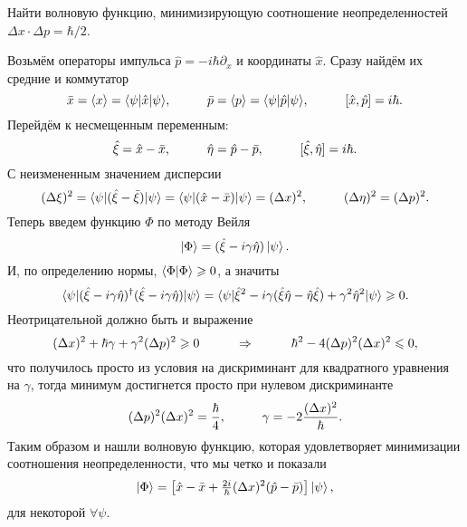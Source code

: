 
\begin{leftrules}
    Найти волновую функцию, минимизирующую соотношение неопределенностей $\Delta x \cdot \Delta p = \hbar/2$.
\end{leftrules}


Возьмём операторы импульса $\hat{p} = - i \hbar \partial_x$ и координаты $\hat{x}$.
Сразу найдём их средние и коммутатор
\begin{equation*}
    \bar{x} = \langle x\rangle = \bk{\psi}[\hat{x}]{\psi},
    \hspace{1 cm}
    \bar{p} = \langle p\rangle = \bk{\psi}[\hat{p}]{\psi},
    \hspace{1 cm}
    [\hat{x}, \hat{p}] = i \hbar.
\end{equation*}
Перейдём к несмещенным переменным:
\begin{equation*}
    \hat{\xi} = \hat{x} - \bar{x},
    \hspace{1 cm}
    \hat{\eta} = \hat{p} - \bar{p},
    \hspace{1 cm}
    [\hat{\xi},\hat{\eta}] = i \hbar .
\end{equation*}
С неизмененным значением дисперсии
\begin{equation*}
    (\Delta \xi)^2 = \bk{\psi}[(\hat{\xi} - \bar{\xi})]{\psi} = \bk{\psi}[(\hat{x} - \bar{x})]{\psi} = (\Delta x)^2,
    \hspace{1 cm}
    (\Delta \eta)^2 = (\Delta p)^2.
\end{equation*}
Теперь введем функцию $\Phi$ по методу Вейля
\begin{equation*}
    \ket{\Phi} = (\hat{\xi} - i \gamma \hat{\eta}) \ket{\psi}.
\end{equation*}
И, по определению нормы, $\bk{\Phi}{\Phi} \geq 0$, а значиты
\begin{equation*}
    \bk{\psi}[(\hat{\xi} - i \gamma \hat{\eta})^\dagger (\hat{\xi} - i \gamma \hat{\eta})]{\psi}
    =
    \bk{\psi}[\hat{\xi}^2 - i \gamma (\hat{\xi} \hat{\eta} - \hat{\eta} \hat{\xi}) + \gamma^2 \hat{\eta}^2]{\psi} \geq 0.
\end{equation*}
Неотрицательной должно быть и выражение
\begin{equation*}
    (\Delta x)^2 + \hbar \gamma  + \gamma^2 (\Delta p)^2 \geq 0
    \hspace{1 cm}
    \Rightarrow
    \hspace{1 cm}
    \hbar^2 - 4 (\Delta p )^2 (\Delta x )^2 \leq 0,
\end{equation*}
что получилось просто из условия на дискриминант для квадратного уравнения на $\gamma$, тогда минимум достигнется просто при нулевом дискриминанте
\begin{equation*}
    (\Delta p)^2 (\Delta x)^2 = \frac{\hbar}{4},
    \hspace{1 cm}
    \gamma = - 2 \frac{(\Delta x)^2}{\hbar}.
\end{equation*}
Таким образом и нашли волновую функцию, которая удовлетворяет минимизации соотношения неопределенности, что мы четко и показали
\begin{equation*}
    \ket{\Phi} = \left[\hat{x} - \bar{x} + \tfrac{2i}{\hbar} (\Delta x)^2 (\hat{p} - \bar{p})\right] \ket{\psi},
\end{equation*}
для некоторой $\forall  \psi$.